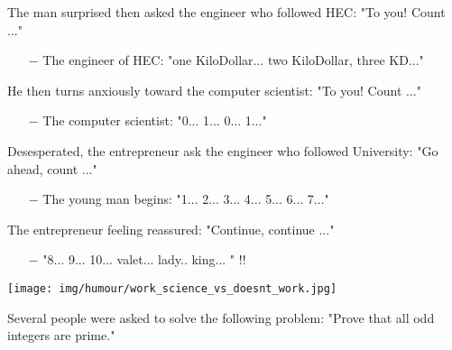 The man surprised then asked the engineer who followed HEC: "To you! Count ..."

\begin{itemize}	 
	\item[$-$] The engineer of HEC: "one KiloDollar... two KiloDollar, three KD..."\end{itemize} 


He then turns anxiously toward the computer scientist: "To you! Count ..."

\begin{itemize}	 
	\item[$-$] The computer scientist: "0... 1... 0... 1..." \end{itemize}

Desesperated, the entrepreneur ask the engineer who followed University: "Go ahead, count ..."

\begin{itemize}	 
	\item[$-$] The young man begins: "1... 2... 3... 4... 5... 6... 7..." \end{itemize}

The entrepreneur feeling reassured: "Continue, continue ..."

\begin{itemize}	 
	\item[$-$] "8... 9... 10... valet... lady.. king... " !!\end{itemize}
	\begin{center}\underline{\hspace{5 cm}}\end{center}
	\begin{center}
		\texttt{[image: img/humour/work\_science\_vs\_doesnt\_work.jpg]}	
	\end{center}
	\pagebreak

Several people were asked to solve the following problem: "Prove that all odd integers are prime."

